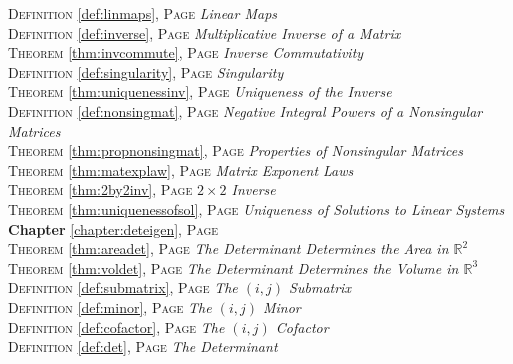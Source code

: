 \begin{multicols}{2}
{\textsc{Definition} \ref{def:linmaps}, \textsc{Page} \pageref{def:linmaps} \textit{Linear Maps} \\
\textsc{Definition} \ref{def:inverse}, \textsc{Page} \pageref{def:inverse} \textit{Multiplicative Inverse of a Matrix} \\
\textsc{Theorem} \ref{thm:invcommute}, \textsc{Page} \pageref{thm:invcommute} \textit{Inverse Commutativity} \\
\textsc{Definition} \ref{def:singularity}, \textsc{Page} \pageref{def:singularity} \textit{Singularity} \\
\textsc{Theorem} \ref{thm:uniquenessinv}, \textsc{Page} \pageref{thm:uniquenessinv} \textit{Uniqueness of the Inverse} \\
\textsc{Definition} \ref{def:nonsingmat}, \textsc{Page} \pageref{def:nonsingmat} \textit{Negative Integral Powers of a Nonsingular Matrices} \\
\textsc{Theorem} \ref{thm:propnonsingmat}, \textsc{Page} \pageref{thm:propnonsingmat} \textit{Properties of Nonsingular Matrices} \\
\textsc{Theorem} \ref{thm:matexplaw}, \textsc{Page} \pageref{thm:matexplaw} \textit{Matrix Exponent Laws} \\
\textsc{Theorem} \ref{thm:2by2inv}, \textsc{Page} \pageref{thm:2by2inv} \textit{\(2\times 2\) Inverse} \\
\textsc{Theorem} \ref{thm:uniquenessofsol}, \textsc{Page} \pageref{thm:uniquenessofsol} \textit{Uniqueness of Solutions to Linear Systems} \\
\textbf{Chapter} \ref{chapter:deteigen}, \textsc{Page} \pageref{chapter:deteigen} \\
\textsc{Theorem} \ref{thm:areadet}, \textsc{Page} \pageref{thm:areadet} \textit{The Determinant Determines the Area in \(\mathbb {R}^2\)} \\
\textsc{Theorem} \ref{thm:voldet}, \textsc{Page} \pageref{thm:voldet} \textit{The Determinant Determines the Volume in \(\mathbb {R}^3\)} \\
\textsc{Definition} \ref{def:submatrix}, \textsc{Page} \pageref{def:submatrix} \textit{The \((i,j)\) Submatrix} \\
\textsc{Definition} \ref{def:minor}, \textsc{Page} \pageref{def:minor} \textit{The \((i,j)\) Minor} \\
\textsc{Definition} \ref{def:cofactor}, \textsc{Page} \pageref{def:cofactor} \textit{The \((i,j)\) Cofactor} \\
\textsc{Definition} \ref{def:det}, \textsc{Page} \pageref{def:det} \textit{The Determinant} \\
}
\end{multicols}
